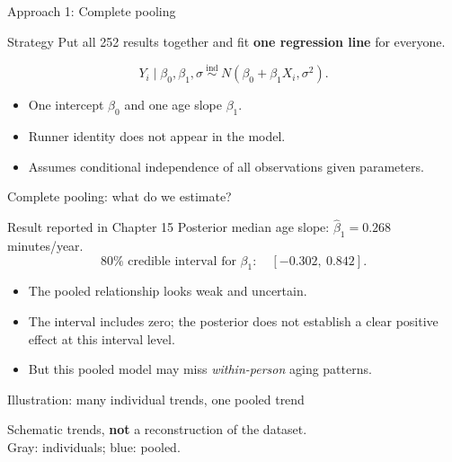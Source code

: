 \documentclass[aspectratio=43,11pt]{beamer}
\begin{document}
\begin{frame}{Approach 1: Complete pooling}
\begin{block}{Strategy}
Put all 252 results together and fit \textbf{one regression line} for everyone.
\end{block}
\[
Y_i\mid\beta_0,\beta_1,\sigma\ \overset{\mathrm{ind}}\sim\
N(\beta_0+\beta_1 X_i,\sigma^2).
\]
\begin{itemize}
\item One intercept \(\beta_0\) and one age slope \(\beta_1\).
\item Runner identity does not appear in the model.
\item Assumes conditional independence of all observations given parameters.
\end{itemize}
\end{frame}

\begin{frame}{Complete pooling: what do we estimate?}
\begin{block}{Result reported in Chapter 15}
Posterior median age slope: \(\hat\beta_1 = 0.268\) minutes/year.
\[
80\%\text{ credible interval for }\beta_1:\quad [-0.302,\ 0.842].
\]
\end{block}
\begin{itemize}
\item The pooled relationship looks weak and uncertain.
\item The interval includes zero; the posterior does not establish a clear positive effect at this interval level.
\item But this pooled model may miss \emph{within-person} aging patterns.
\end{itemize}
\end{frame}

\begin{frame}{Illustration: many individual trends, one pooled trend}
\centering
{}
\vspace{-1mm}
{\scriptsize Schematic trends, \textbf{not} a reconstruction of the dataset.\\
             Gray: individuals; blue: pooled.}
\end{frame}
\end{document}

